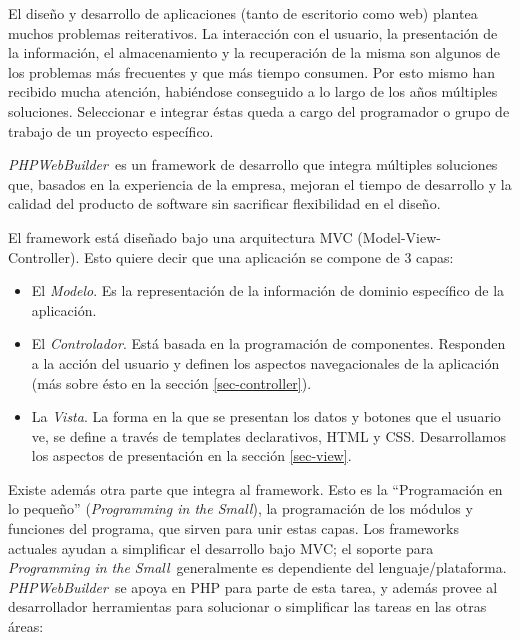 \documentclass[a4paper,10pt]{article}
\newcommand{\PITS}{\emph{Programming in the Small}} %
\newcommand{\PWB}{\emph{PHPWebBuilder}}
\begin{document}
El diseño y desarrollo de aplicaciones (tanto de escritorio como web) plantea muchos problemas reiterativos. La interacción con el usuario, la presentación de la información, el almacenamiento y la recuperación de la misma son algunos de los problemas más frecuentes y que más tiempo consumen.
Por esto mismo han recibido mucha atención, habiéndose conseguido a lo largo de los años múltiples soluciones. Seleccionar e integrar éstas queda a cargo del programador o grupo de trabajo de un proyecto específico.

\PWB \ es un framework de desarrollo que integra múltiples soluciones que, basados en la experiencia de la empresa, mejoran el tiempo de desarrollo y la calidad del producto de software sin sacrificar flexibilidad en el diseño.


El framework está diseñado bajo una arquitectura MVC (Model-View-Controller)\cite{mvc}.
Esto quiere decir que una aplicación se compone de 3 capas:
\begin{itemize}
\item El \emph{Modelo}. Es la representación de la información de dominio específico de la aplicación.
\item El \emph{Controlador}. Está basada en la programación de componentes. Responden a la acción del usuario y definen los aspectos navegacionales de la aplicación (más sobre ésto en la sección \ref{sec-controller}).
\item La \emph{Vista}. La forma en la que se presentan los datos y botones que el usuario ve, se define a través de templates declarativos, HTML y CSS. Desarrollamos los aspectos de presentación en la sección \ref{sec-view}.
\end{itemize}

Existe además otra parte que integra al framework. Esto es la ``Programación en lo pequeño'' (\PITS), la programación de los módulos y funciones del programa, que sirven para unir estas capas. Los frameworks actuales ayudan a simplificar el desarrollo bajo MVC; el soporte para \PITS \ generalmente es dependiente del lenguaje/plataforma. \PWB \ se apoya en PHP para parte de esta tarea, y además provee al desarrollador herramientas para solucionar o simplificar las tareas en las otras áreas:
\end{document}
